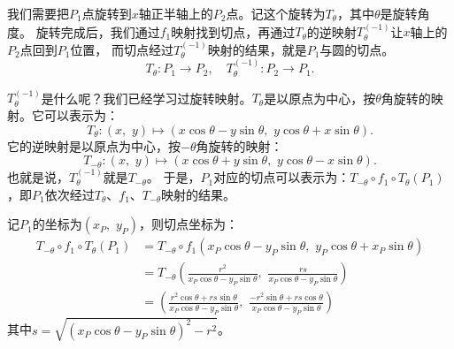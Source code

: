 \documentclass[12pt,UTF8]{ctexbook}
\begin{document}
我们需要把$P_1$点旋转到$x$轴正半轴上的$P_2$点。记这个旋转为$T_\theta$，其中$\theta$是旋转角度。
旋转完成后，我们通过$f_1$映射找到切点，再通过$T_\theta$的逆映射$T_\theta^{(-1)}$让$x$轴上的$P_2$点回到$P_1$位置，
而切点经过$T_\theta^{(-1)}$映射的结果，就是$P_1$与圆的切点。
$$T_\theta: P_1 \longrightarrow P_2, \quad T_\theta^{(-1)}: P_2 \longrightarrow P_1.$$

$T_\theta^{(-1)}$是什么呢？我们已经学习过旋转映射。$T_\theta$是以原点为中心，按$\theta$角旋转的映射。它可以表示为：
$$T_\theta: (x,\,\, y) \mapsto (x\cos{\theta} - y\sin{\theta},\,\,y\cos{\theta} + x\sin{\theta}).$$
它的逆映射是以原点为中心，按$-\theta$角旋转的映射：
$$T_{-\theta}: (x,\,\, y) \mapsto (x\cos{\theta} + y\sin{\theta},\,\,y\cos{\theta} - x\sin{\theta}).$$
也就是说，$T_\theta^{(-1)}$就是$T_{-\theta}$。
于是，$P_1$对应的切点可以表示为：$T_{-\theta}\circ f_1\circ T_\theta(P_1)$，即$P_1$依次经过$T_\theta$、$f_1$、$T_{-\theta}$映射的结果。

记$P_1$的坐标为$(x_P,\,\,y_P)$，则切点坐标为：
\begin{align*}
    T_{-\theta}\circ f_1\circ T_\theta(P_1) &= T_{-\theta}\circ f_1(x_P\cos{\theta} - y_P\sin{\theta},\,\,y_P\cos{\theta} + x_P\sin{\theta})  \\
    &= T_{-\theta}\left(\frac{r^2}{x_P\cos{\theta} - y_P\sin{\theta}},\,\, \frac{rs}{x_P\cos{\theta} - y_P\sin{\theta}}\right)  \\
    &= \left(\frac{r^2\cos{\theta} + rs\sin{\theta}}{x_P\cos{\theta} - y_P\sin{\theta}},\,\, \frac{-r^2\sin{\theta} + rs\cos{\theta}}{x_P\cos{\theta} - y_P\sin{\theta}}\right) 
\end{align*}
其中$s = \sqrt{(x_P\cos{\theta} - y_P\sin{\theta})^2 - r^2}$。
\end{document}

